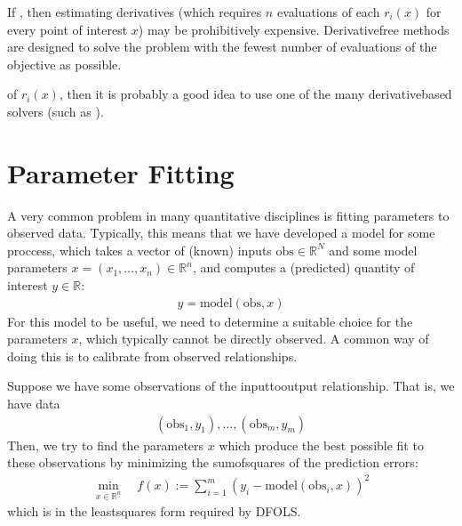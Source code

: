 \documentclass[letterpaper,10pt,english]{sphinxmanual}
\begin{document}
\sphinxAtStartPar
If , then estimating derivatives (which requires \(n\) evaluations of each \(r_i(x)\) for every point of interest \(x\)) may be prohibitively expensive. Derivative\sphinxhyphen{}free methods are designed to solve the problem with the fewest number of evaluations of the objective as possible.

\sphinxAtStartPar
{} of \(r_i(x)\), then it is probably a good idea to use one of the many derivative\sphinxhyphen{}based solvers (such as ).


\section{Parameter Fitting}
\label{\detokenize{info:parameter-fitting}}
\sphinxAtStartPar
A very common problem in many quantitative disciplines is fitting parameters to observed data. Typically, this means that we have developed a model for some proccess, which takes a vector of (known) inputs \(\mathrm{obs}\in\mathbb{R}^N\) and some model parameters \(x=(x_1, \ldots, x_n)\in\mathbb{R}^n\), and computes a (predicted) quantity of interest \(y\in\mathbb{R}\):
\begin{equation*}
\begin{split}y = \mathrm{model}(\mathrm{obs}, x)\end{split}
\end{equation*}
\sphinxAtStartPar
For this model to be useful, we need to determine a suitable choice for the parameters \(x\), which typically cannot be directly observed. A common way of doing this is to calibrate from observed relationships.

\sphinxAtStartPar
Suppose we have some observations of the input\sphinxhyphen{}to\sphinxhyphen{}output relationship. That is, we have data
\begin{equation*}
\begin{split}(\mathrm{obs}_1, y_1), \ldots, (\mathrm{obs}_m, y_m)\end{split}
\end{equation*}
\sphinxAtStartPar
Then, we try to find the parameters \(x\) which produce the best possible fit to these observations by minimizing the sum\sphinxhyphen{}of\sphinxhyphen{}squares of the prediction errors:
\begin{equation*}
\begin{split}\min_{x\in\mathbb{R}^n}  \quad  f(x) := \sum_{i=1}^{m}(y_i - \mathrm{model}(\mathrm{obs}_i, x))^2\end{split}
\end{equation*}
\sphinxAtStartPar
which is in the least\sphinxhyphen{}squares form required by DFO\sphinxhyphen{}LS.
\end{document}
